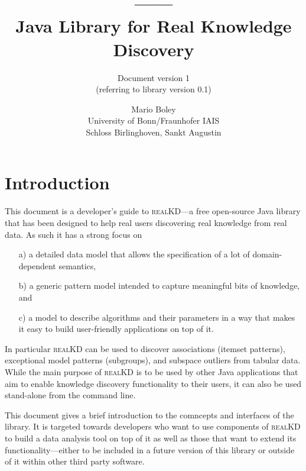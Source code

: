 \documentclass{scrartcl}
\title{---\kdtub---\\Java Library for Real Knowledge Discovery}
\subtitle{Document version 1 \\ (referring to library version 0.1)}
\author{Mario Boley\\University of Bonn/Fraunhofer
IAIS\\Schloss Birlinghoven, Sankt Augustin}
\newcommand{\kdtub}{\textsc{realKD}\xspace}
\begin{document}
\maketitle

\section{Introduction}
This document is a developer's guide to \kdtub---a free open-source Java library
that has been designed to help real users discovering real knowledge from real data. 
As such it has a strong focus on
\begin{itemize}
\item[a)] a detailed data model that allows the specification of a lot of
domain-dependent semantics,
\item[b)] a generic pattern model intended to capture meaningful bits of
knowledge, and
\item[c)] a model to describe algorithms and their parameters in a way that
makes it easy to build user-friendly applications on top of it.
\end{itemize}
In particular \kdtub can be used to discover associations (itemset patterns),
exceptional model patterns (subgroups), and subspace outliers from tabular data.
While the main purpose of \kdtub is to be used by other Java applications that
aim to enable knowledge discovery functionality to their users, it can also be used
stand-alone from the command line.

This document gives a brief introduction to the comncepts and interfaces of
the library. It is targeted towards developers who want to use components of
\kdtub to build a data analysis tool on top of it as well as those that want to extend its functionality---either to be included in a future version of this library or
outside of it within other third party software.

% 
% 
% 
\end{document}
